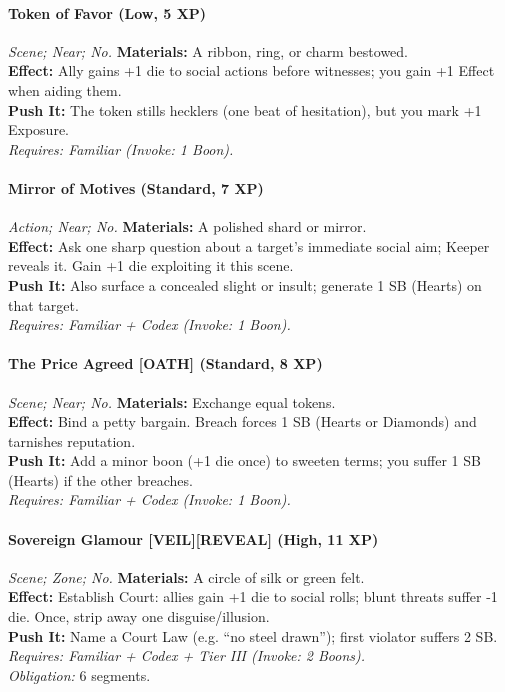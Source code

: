 \paragraph*{Token of Favor (Low, 5 XP)} \emph{Scene; Near; No.}  
\textbf{Materials:} A ribbon, ring, or charm bestowed.\\
\textbf{Effect:} Ally gains +1 die to social actions before witnesses; you gain +1 Effect when aiding them.\\
\textbf{Push It:} The token stills hecklers (one beat of hesitation), but you mark +1 Exposure.\\
\emph{Requires: Familiar (\textit{Invoke:} 1 Boon).}

\paragraph{Mirror of Motives (Standard, 7 XP)} \emph{Action; Near; No.}  
\textbf{Materials:} A polished shard or mirror.\\
\textbf{Effect:} Ask one sharp question about a target’s immediate social aim; Keeper reveals it. Gain +1 die exploiting it this scene.\\
\textbf{Push It:} Also surface a concealed slight or insult; generate 1 SB (Hearts) on that target.\\
\emph{Requires: Familiar + Codex (\textit{Invoke:} 1 Boon).}

\paragraph{The Price Agreed \textnormal{[OATH]} (Standard, 8 XP)} \emph{Scene; Near; No.}  
\textbf{Materials:} Exchange equal tokens.\\
\textbf{Effect:} Bind a petty bargain. Breach forces 1 SB (Hearts or Diamonds) and tarnishes reputation.\\
\textbf{Push It:} Add a minor boon (+1 die once) to sweeten terms; you suffer 1 SB (Hearts) if the other breaches.\\
\emph{Requires: Familiar + Codex (\textit{Invoke:} 1 Boon).}

\paragraph{Sovereign Glamour \textnormal{[VEIL][REVEAL]} (High, 11 XP)} \emph{Scene; Zone; No.}  
\textbf{Materials:} A circle of silk or green felt.\\
\textbf{Effect:} Establish Court: allies gain +1 die to social rolls; blunt threats suffer -1 die. Once, strip away one disguise/illusion.\\
\textbf{Push It:} Name a Court Law (e.g. “no steel drawn”); first violator suffers 2 SB.\\
\emph{Requires: Familiar + Codex + Tier III (\textit{Invoke:} 2 Boons).}\\
\emph{Obligation:} 6 segments.


